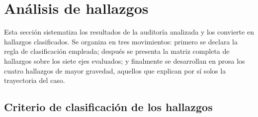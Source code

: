 %
%
%
%
%

\section{Análisis de hallazgos}
\label{sec:hallazgos}

Esta sección sistematiza los resultados de la auditoría analizada y los convierte
en hallazgos clasificados. Se organiza en tres movimientos: primero se declara la
regla de clasificación empleada; después se presenta la matriz completa de
hallazgos sobre los siete ejes evaluados; y finalmente se desarrollan en prosa los
cuatro hallazgos de mayor gravedad, aquellos que explican por sí solos la
trayectoria del caso.

\subsection{Criterio de clasificación de los hallazgos}

